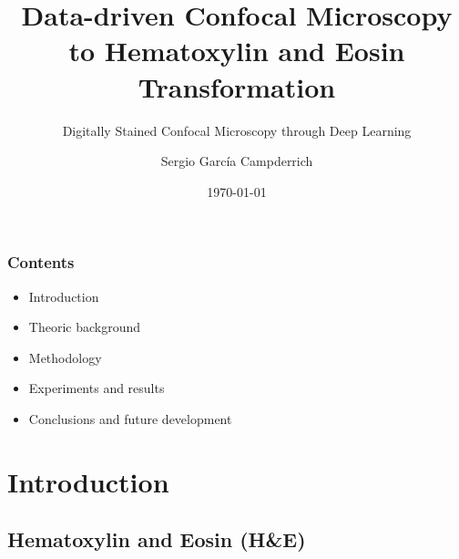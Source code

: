 \documentclass[t]{beamer}
\title{Data-driven Confocal Microscopy to Hematoxylin and Eosin Transformation}
\subtitle{Digitally Stained Confocal Microscopy through Deep Learning}
\author{Sergio García Campderrich}
\date{\today}
\begin{document}
\maketitle

\begin{frame}
\frametitle{Contents}

\begin{itemize}
\item Introduction\pause
\item Theoric background\pause
\item Methodology\pause
\item Experiments and results\pause
\item Conclusions and future development
\end{itemize}

\end{frame}



\section{Introduction}

\subsection{Hematoxylin and Eosin (H\&E)}
\end{document}
